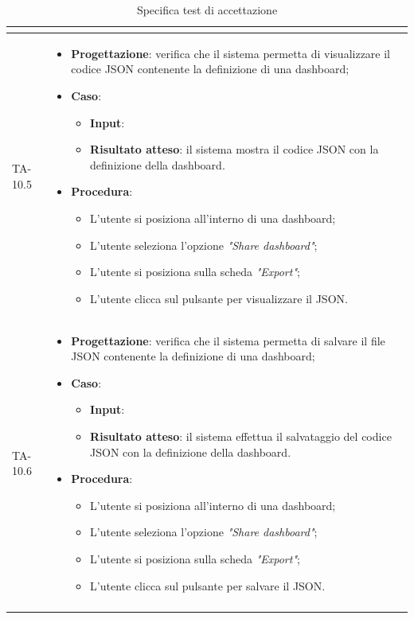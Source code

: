 \begin{longtable}{|C{2.5cm}|C{13cm}|}
\begin{itemize}
\begin{itemize}
	\end{itemize} 
\end{itemize}\\
\hline
{TA-10.5} &
\begin{itemize}
	\item \textbf{Progettazione}: verifica che il sistema permetta di visualizzare il codice JSON contenente la definizione
	di una dashboard;
	\item \textbf{Caso}: 
	\begin{itemize}
		\item \textbf{Input}: 
		\item \textbf{Risultato atteso}: il sistema mostra il codice JSON con la definizione della dashboard.
	\end{itemize}
	\item \textbf{Procedura}:
	\begin{itemize}
		\item L'utente si posiziona all'interno di una dashboard;
		\item L'utente seleziona l'opzione \emph{"Share dashboard"};
		\item L'utente si posiziona sulla scheda \emph{"Export"};
		\item L'utente clicca sul pulsante per visualizzare il JSON.
	\end{itemize} 
\end{itemize}\\
\hline
{TA-10.6} &
\begin{itemize}
	\item \textbf{Progettazione}: verifica che il sistema permetta di salvare il file JSON contenente la definizione di una
	dashboard;
	\item \textbf{Caso}: 
	\begin{itemize}
		\item \textbf{Input}: 
		\item \textbf{Risultato atteso}: il sistema effettua il salvataggio del codice JSON con la definizione della dashboard.
	\end{itemize}
	\item \textbf{Procedura}:
	\begin{itemize}
		\item L'utente si posiziona all'interno di una dashboard;
		\item L'utente seleziona l'opzione \emph{"Share dashboard"};
		\item L'utente si posiziona sulla scheda \emph{"Export"};
		\item L'utente clicca sul pulsante per salvare il JSON.
	\end{itemize} 
\end{itemize}\\
\hline
\caption{Specifica test di accettazione}
\end{longtable}
\renewcommand{\arraystretch}{1}
\newpage

